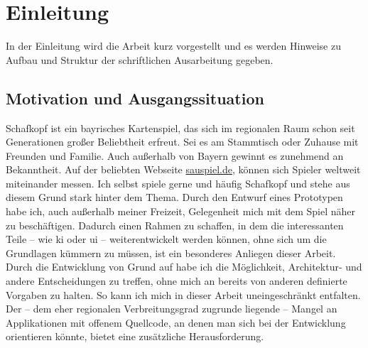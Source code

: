 \documentclass[
							a4paper, 
							11pt, 
							openany, 
							liststotoc,
							parskip=half, 
   							headings=normal
						]{scrreprt}
\begin{document}

\tableofcontents 
\clearpage
{} 
\setcounter{page}{1}

\chapter{Einleitung} \label{ch:einleitung}
In der Einleitung wird die Arbeit kurz vorgestellt und es werden Hinweise zu Aufbau und Struktur der schriftlichen Ausarbeitung gegeben.

\section{Motivation und Ausgangssituation} \label{se:einleitung_motivation}
Schafkopf ist ein bayrisches Kartenspiel, das sich im regionalen Raum schon seit Generationen großer Beliebtheit erfreut. Sei es am Stammtisch oder Zuhause mit Freunden und Familie.\newline
Auch außerhalb von Bayern gewinnt es zunehmend an Bekanntheit. Auf der beliebten Webseite \href{https://www.sauspiel.de/}{sauspiel.de}, können sich Spieler weltweit miteinander messen.\newline
Ich selbst spiele gerne und häufig Schafkopf und stehe aus diesem Grund stark hinter dem Thema.\newline
Durch den Entwurf eines Prototypen habe ich, auch außerhalb meiner Freizeit, Gelegenheit mich mit dem Spiel näher zu beschäftigen. Dadurch einen Rahmen zu schaffen, in dem die interessanten Teile -- wie \acs{ki} oder \acs{ui} -- weiterentwickelt werden können, ohne sich um die Grundlagen kümmern zu müssen, ist ein besonderes Anliegen dieser Arbeit.\newline
Durch die Entwicklung von Grund auf habe ich die Möglichkeit, Architektur- und andere Entscheidungen zu treffen, ohne mich an bereits von anderen definierte Vorgaben zu halten. So kann ich mich in dieser Arbeit uneingeschränkt entfalten.\newline
Der -- dem eher regionalen Verbreitungsgrad zugrunde liegende -- Mangel an Applikationen mit offenem Quellcode, an denen man sich bei der Entwicklung orientieren könnte, bietet eine zusätzliche Herausforderung.
\end{document}
